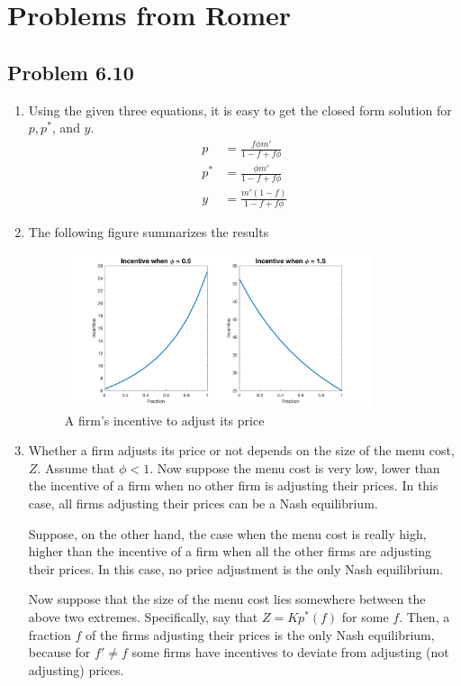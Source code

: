 \documentclass[11pt]{amsart}
\begin{document}
\section{Problems from Romer}
\subsection{Problem 6.10}
\begin{enumerate}[label=(\alph*)]
	\item Using the given three equations, it is easy to get the closed form solution for $p, p^{*}$, and $y$. 
	\begin{align*}
	p & = \frac{f \phi m'}{1 - f + f\phi} \\
	p^{*} & = \frac{\phi m'}{1 - f + f\phi} \\
	y & = \frac{m' (1-f)}{1 - f + f\phi}
	\end{align*}
	\item The following figure summarizes the results
	\begin{figure}[H]
		\centering
		\includegraphics[width=0.85\textwidth]{611b}
		\caption{A firm's incentive to adjust its price}
	\end{figure}
	\item Whether a firm adjusts its price or not depends on the size of the menu cost, $Z$. Assume that $\phi <1$. Now suppose the menu cost is very low, lower than the incentive of a firm when no other firm is adjusting their prices. In this case, all firms adjusting their prices can be a Nash equilibrium. 
	
	Suppose, on the other hand, the case when the menu cost is really high, higher than the incentive of a firm when all the other firms are adjusting their prices. In this case, no price adjustment is the only Nash equilibrium. 
	
	Now suppose that the size of the menu cost lies somewhere between the above two extremes. Specifically, say that $Z = K p^{*} (f)$ for some $f$. Then, a fraction $f$ of the firms adjusting their prices is the only Nash equilibrium, because for $f' \neq f$ some firms have incentives to deviate from adjusting (not adjusting) prices. 
\end{enumerate}
\end{document}
